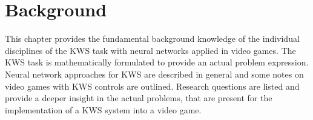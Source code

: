 





\chapter{Background}\label{sec:back}
\thesisStateNew
This chapter provides the fundamental background knowledge of the individual disciplines of the KWS task with neural networks applied in video games.
The KWS task is mathematically formulated to provide an actual problem expression.
Neural network approaches for KWS are described in general and some notes on video games with KWS controls are outlined.
Research questions are listed and provide a deeper insight in the actual problems, that are present for the implementation of a KWS system into a video game.





